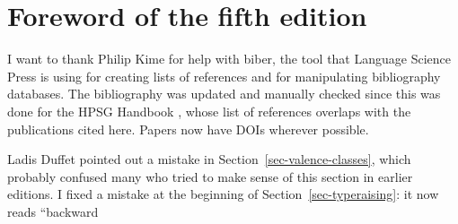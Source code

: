 
\section*{Foreword of the fifth edition}

I want to thank Philip Kime for help with biber, the tool that Language Science Press is using for
creating lists of references and for manipulating bibliography databases. The bibliography was
updated and manually checked since this was done for the HPSG Handbook \citep*{HPSGHandbook}, whose
list of references overlaps with the publications cited here. Papers now have DOIs wherever possible.

Ladis Duffet pointed out a mistake in Section~\ref{sec-valence-classes}, which probably confused many who tried to make
sense of this section in earlier editions.
%
%
%
%
%
%
%
%
%
%
%
%
%
%
%
%
%
%
%
I fixed a mistake at the beginning of Section~\ref{sec-typeraising}: it now reads ``backward
